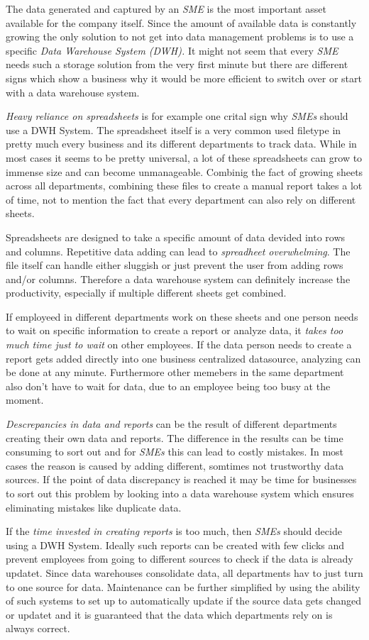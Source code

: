 \documentclass[../paper.tex]{subfiles}
\begin{document}
The data generated and captured by an \textit{SME} is the most important asset available for the company itself. Since the amount of available
data is constantly growing the only solution to not get into data management problems is to use a specific \textit{Data Warehouse System (DWH).}
It might not seem that every \textit{SME} needs such a storage solution from the very first minute but there are different signs which show a business
why it would be more efficient to switch over or start with a data warehouse system.

\textit{Heavy reliance on spreadsheets} is for example one crital sign why \textit{SMEs} should use a DWH System. The spreadsheet itself is a very
common used filetype in pretty much every business and its different departments to track data. While in most cases it seems to be pretty universal,
a lot of these spreadsheets can grow to immense size and can become unmanageable. Combinig the fact of growing sheets across all departments, combining
these files to create a manual report takes a lot of time, not to mention the fact that every department can also rely on different sheets.

Spreadsheets are designed to take a specific amount of data devided into rows and columns. Repetitive data adding can lead to
\textit{spreadheet overwhelming}. The file itself can handle either sluggish or just prevent the user from adding rows and/or columns. Therefore a
data warehouse system can definitely increase the productivity, especially if multiple different sheets get combined.

If employeed in different departments work on these sheets and one person needs to wait on specific information to create a report or 
analyze data, it \textit{takes too much time just to wait} on other employees. If the data person needs to create a report gets added directly into one
business centralized datasource, analyzing can be done at any minute. Furthermore other memebers in the same department also don't have to wait for
data, due to an employee being too busy at the moment.

\textit{Descrepancies in data and reports} can be the result of different departments creating their own data and reports. The difference in the results
can be time consuming to sort out and for \textit{SMEs} this can lead to costly mistakes. In most cases the reason is caused by adding different,
somtimes not trustworthy data sources. If the point of data discrepancy is reached it may be time for businesses to sort out this problem by looking
into a data warehouse system which ensures eliminating mistakes like duplicate data.

If the \textit{time invested in creating reports} is too much, then \textit{SMEs} should decide using a DWH System. Ideally such reports can be created
with few clicks and prevent employees from going to different sources to check if the data is already updatet. Since data warehouses consolidate data,
all departments hav to just turn to one source for data. Maintenance can be further simplified by using the ability of such systems to set up to
automatically update if the source data gets changed or updatet and it is guaranteed that the data which departments rely on is always correct.
\end{document}
